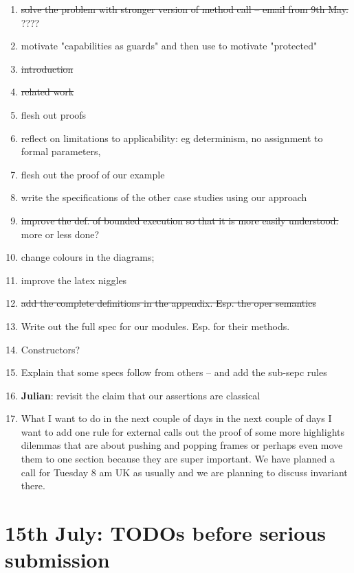 \documentclass[acmsmall,review,anonymous]{acmart}\settopmatter{printfolios=true}
\begin{document}
\begin{enumerate}
\item
\st{solve the problem with stronger version of method call -- email from 9th May.} ????

\item
motivate "capabilities as guards" and then use to motivate "protected"
\item
\st{introduction}
\item
\st{related work}
\item
flesh out proofs
\item
reflect on limitations to applicability: eg determinism, no assignment to formal parameters, 
\item
flesh out the proof of our example
\item
write the specifications of the other case studies using our approach
\item
\st{improve the def. of bounded execution so that it is more easily understood.} more or less done?
\item
change colours in the diagrams; 
\item
improve the latex niggles 
\item
\st{add the complete definitions in the appendix. Esp. the oper semantics}
\item
Write out the full spec for our modules. Esp. for their methods.
\item
Constructors?

\item
Explain that some specs follow from others -- and add the sub-sepc rules

\item 
\textbf{Julian}: revisit the claim that our assertions are classical

\item
What I want to do in the next couple of days in the next couple of days I want to add one rule for external calls out the proof of some more highlights dilemmas that are about pushing and popping frames or perhaps even move them to one section because they are super important. We have planned a call for Tuesday 8 am UK as usually and we are planning to discuss invariant there.
\end{enumerate}

\section{15th July: TODOs before serious submission}
\end{document}
